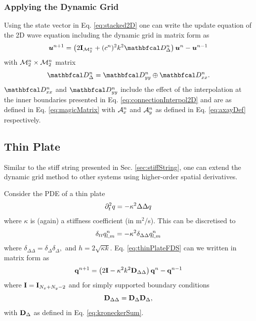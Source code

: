 \documentclass[fleqn]{jaes}
\begin{document}
\subsubsection{Applying the Dynamic Grid}
Using the state vector in Eq. \eqref{eq:stacked2D} one can write the update equation of the 2D wave equation including the dynamic grid in matrix form as
\begin{equation}\label{eq:2DwaveDynMatrix}
    \uStack^{n+1} = \left(2\I_\MtwoD + (c^n)^2k^2\DDdelta\right)\uStack^n -\uStack^{n-1}
\end{equation}
with ${\mathcal{M}_2^n} \times {\mathcal{M}_2^n}$ matrix
\begin{equation}
    \DDdelta = \DDyy \oplus \DDxx.
\end{equation}
$\DDxx$ and $\DDyy$ include the effect of the interpolation at the inner boundaries presented in Eq. \eqref{eq:connectionInterpol2D} and are as defined in Eq. \eqref{eq:magicMatrix} with $\mathcal{A}^n_x$ and $\mathcal{A}^n_y$ as defined in Eq. \eqref{eq:axayDef} respectively. 

\subsection{Thin Plate}
Similar to the stiff string presented in Sec. \ref{sec:stiffString}, one can extend the dynamic grid method to other systems using higher-order spatial derivatives.

Consider the PDE of a thin plate \cite{Morse1968}
\begin{equation}\label{eq:thinPlateFDS}
    \ptt q = -\kappa^2\Delta\Delta q
\end{equation}
where $\kappa$ is (again) a stiffness coefficient (in m$^2$/s). This can be discretised to 
\begin{equation}
    \delta_{tt}q_{l,m}^n = -\kappa^2\delta_{\Delta\Delta}q_{l,m}^n
\end{equation}
where $\delta_{\Delta\Delta} = \delta_{\Delta}\delta_{\Delta},$ and $ h = 2\sqrt{\kappa k}$. 
Eq. \eqref{eq:thinPlateFDS} can we written in matrix form as
\begin{equation}
    \mathbf{q}^{n+1} = \left(2\mathbf{I} - \kappa^2 k^2 \mathbf{D}_{\Delta\Delta}\right)\mathbf{q}^n - \mathbf{q}^{n-1}
\end{equation}
where $\mathbf{I} = \mathbf{I}_{N_x + N_y - 2}$ and for simply supported boundary conditions
\begin{equation}
    \mathbf{D}_{\Delta\Delta} = \mathbf{D}_\Delta\mathbf{D}_\Delta,
\end{equation}
with $\mathbf{D}_\Delta$ as defined in Eq. \eqref{eq:kroneckerSum}.
\end{document}
